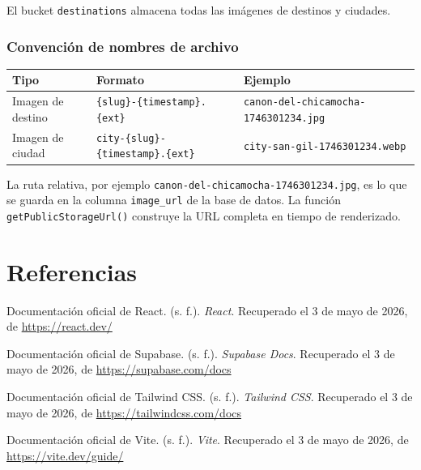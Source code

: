\documentclass[12pt,letterpaper]{article}
\newcommand{\code}[1]{\texttt{#1}}
\begin{document}
El bucket \code{destinations} almacena todas las imágenes de destinos y ciudades.

\subsubsection*{Convención de nombres de archivo}

\begin{longtable}{p{} p{} p{}}
\toprule
\textbf{Tipo} & \textbf{Formato} & \textbf{Ejemplo} \\
\midrule
Imagen de destino & \code{\{slug\}-\{timestamp\}.\{ext\}} & \code{canon-del-chicamocha-1746301234.jpg} \\
Imagen de ciudad & \code{city-\{slug\}-\{timestamp\}.\{ext\}} & \code{city-san-gil-1746301234.webp} \\
\bottomrule
\end{longtable}

La ruta relativa, por ejemplo \code{canon-del-chicamocha-1746301234.jpg}, es lo que se guarda en la columna \code{image\_url} de la base de datos. La función \code{getPublicStorageUrl()} construye la URL completa en tiempo de renderizado.



\newpage
\section*{Referencias}

Documentación oficial de React. (s. f.). \textit{React}. Recuperado el 3 de mayo de 2026, de \url{https://react.dev/}

Documentación oficial de Supabase. (s. f.). \textit{Supabase Docs}. Recuperado el 3 de mayo de 2026, de \url{https://supabase.com/docs}

Documentación oficial de Tailwind CSS. (s. f.). \textit{Tailwind CSS}. Recuperado el 3 de mayo de 2026, de \url{https://tailwindcss.com/docs}

Documentación oficial de Vite. (s. f.). \textit{Vite}. Recuperado el 3 de mayo de 2026, de \url{https://vite.dev/guide/}
\end{document}
